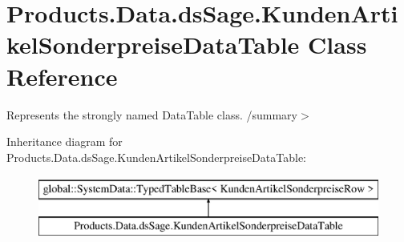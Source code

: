 \hypertarget{class_products_1_1_data_1_1ds_sage_1_1_kunden_artikel_sonderpreise_data_table}{}\section{Products.\+Data.\+ds\+Sage.\+Kunden\+Artikel\+Sonderpreise\+Data\+Table Class Reference}
\label{class_products_1_1_data_1_1ds_sage_1_1_kunden_artikel_sonderpreise_data_table}


Represents the strongly named Data\+Table class. /summary$>$  


Inheritance diagram for Products.\+Data.\+ds\+Sage.\+Kunden\+Artikel\+Sonderpreise\+Data\+Table\+:\begin{figure}[H]
\begin{center}
\leavevmode
\includegraphics[height=2.000000cm]{class_products_1_1_data_1_1ds_sage_1_1_kunden_artikel_sonderpreise_data_table}
\end{center}
\end{figure}
